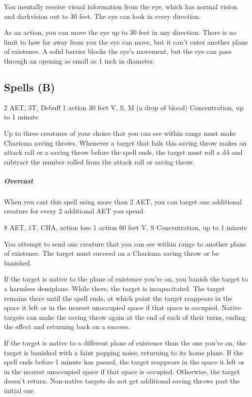You mentally receive visual information from the eye, which has normal vision and darkvision out to 30 feet. The eye can look in every direction.

As an action, you can move the eye up to 30 feet in any direction. There is no limit to how far away from you the eye can move, but it can't enter another plane of existence. A solid barrier blocks the eye's movement, but the eye can pass through an opening as small as 1 inch in diameter.

\subsection{Spells (B)}

{2 AET, 3T, Debuff}
{1 action}
{30 feet}
{V, S, M (a drop of blood)}
{Concentration, up to 1 minute}

Up to three creatures of your choice that you can see within range must make Charisma saving throws. Whenever a target that fails this saving throw makes an attack roll or a saving throw before the spell ends, the target must roll a d4 and subtract the number rolled from the attack roll or saving throw.

\subparagraph*{Overcast} When you cast this spell using more than 2 AET, you can target one additional creature for every 2 additional AET you spend.


{8 AET, 1T, CHA, action loss}
{1 action}
{60 feet}
{V, S}
{Concentration, up to 1 minute}

You attempt to send one creature that you can see within range to another plane of existence. The target must succeed on a Charisma saving throw or be banished.

If the target is native to the plane of existence you're on, you banish the target to a harmless demiplane. While there, the target is incapacitated. The target remains there until the spell ends, at which point the target reappears in the space it left or in the nearest unoccupied space if that space is occupied. Native targets can make the saving throw again at the end of each of their turns, ending the effect and returning back on a success.

If the target is native to a different plane of existence than the one you're on, the target is banished with a faint popping noise, returning to its home plane. If the spell ends before 1 minute has passed, the target reappears in the space it left or in the nearest unoccupied space if that space is occupied. Otherwise, the target doesn't return. Non-native targets do not get additional saving throws past the initial one.

